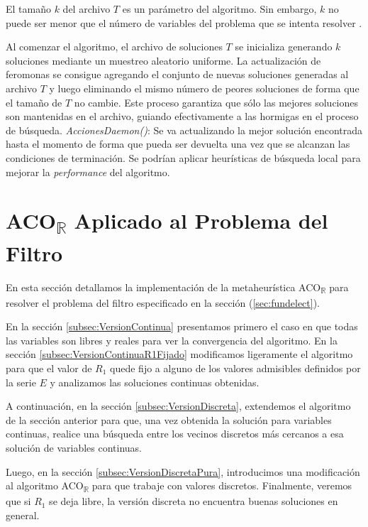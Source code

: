 \documentclass{llncs}
\begin{document}
	El tamaño $k$ del archivo $T$ es un parámetro del algoritmo. Sin embargo, $k$ no puede ser menor que el número de variables
	del problema que se intenta resolver \cite{soc:dor}.
	
	Al comenzar el algoritmo, el archivo de soluciones $T$ se inicializa generando $k$ soluciones mediante un muestreo aleatorio uniforme.
	La actualización de feromonas se consigue agregando el conjunto de nuevas soluciones generadas al archivo $T$ y luego eliminando
	el mismo número de peores soluciones de forma que el tamaño de $T$ no cambie. Este proceso garantiza que sólo las mejores
	soluciones son mantenidas en el archivo, guiando efectivamente a las hormigas en el proceso de búsqueda.
	\bigbreak
	\textit{AccionesDaemon()}: Se va actualizando la mejor solución encontrada hasta el momento de forma que pueda ser devuelta
	una vez que se alcanzan las condiciones de terminación. Se podrían aplicar heurísticas de búsqueda local para 
	mejorar la \textit{performance} del algoritmo.
	
	\section{\textbf{ACO\textsubscript{$\mathbb{R}$} Aplicado al Problema del Filtro}}
	En esta sección detallamos la implementación de la metaheurística ACO\textsubscript{$\mathbb{R}$} 
	para resolver el problema del filtro especificado en la sección (\ref{sec:fundelect}).
	
	En la sección \ref{subsec:VersionContinua} presentamos primero el caso en que todas las variables 
	son libres y reales para ver la convergencia del algoritmo.  En la sección \ref{subsec:VersionContinuaR1Fijado}
	modificamos ligeramente el algoritmo para que el valor de $R_1$ quede fijo a alguno de los valores admisibles definidos por la serie $E$ 
	y analizamos las soluciones continuas obtenidas.
	
	A continuación, en la sección \ref{subsec:VersionDiscreta}, extendemos el algoritmo de la sección anterior
	para que, una vez obtenida la solución para variables continuas, 
	realice una búsqueda entre los vecinos discretos más cercanos a esa solución de variables continuas.
	
	Luego, en la sección \ref{subsec:VersionDiscretaPura}, introducimos una modificación al algoritmo 
	ACO\textsubscript{$\mathbb{R}$} para que trabaje con valores discretos. 
	Finalmente, veremos que si $R_1$ se deja libre, la versión discreta no encuentra buenas soluciones en general.
	
\end{document}
